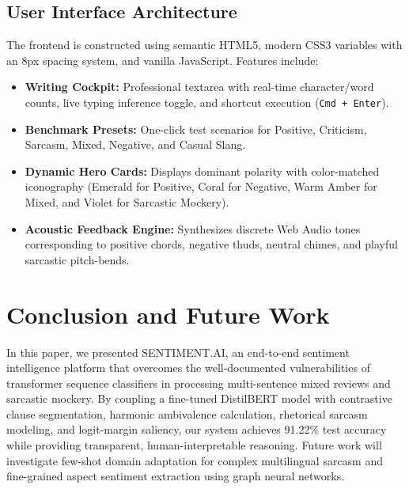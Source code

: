 \documentclass[conference]{IEEEtran}
\begin{document}
\subsection{User Interface Architecture}
The frontend is constructed using semantic HTML5, modern CSS3 variables with an 8px spacing system, and vanilla JavaScript. Features include:
\begin{itemize}
    \item \textbf{Writing Cockpit:} Professional textarea with real-time character/word counts, live typing inference toggle, and shortcut execution (\texttt{Cmd + Enter}).
    \item \textbf{Benchmark Presets:} One-click test scenarios for Positive, Criticism, Sarcasm, Mixed, Negative, and Casual Slang.
    \item \textbf{Dynamic Hero Cards:} Displays dominant polarity with color-matched iconography (Emerald for Positive, Coral for Negative, Warm Amber for Mixed, and Violet for Sarcastic Mockery).
    \item \textbf{Acoustic Feedback Engine:} Synthesizes discrete Web Audio tones corresponding to positive chords, negative thuds, neutral chimes, and playful sarcastic pitch-bends.
\end{itemize}

\section{Conclusion and Future Work}
In this paper, we presented SENTIMENT.AI, an end-to-end sentiment intelligence platform that overcomes the well-documented vulnerabilities of transformer sequence classifiers in processing multi-sentence mixed reviews and sarcastic mockery. By coupling a fine-tuned DistilBERT model with contrastive clause segmentation, harmonic ambivalence calculation, rhetorical sarcasm modeling, and logit-margin saliency, our system achieves 91.22\% test accuracy while providing transparent, human-interpretable reasoning. Future work will investigate few-shot domain adaptation for complex multilingual sarcasm and fine-grained aspect sentiment extraction using graph neural networks.
\end{document}
